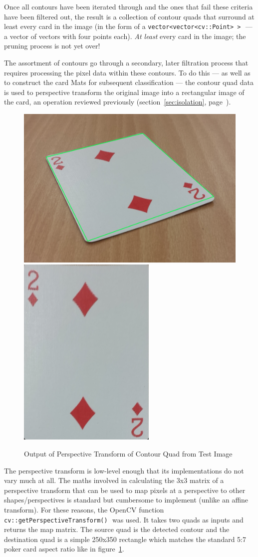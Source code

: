 \documentclass[a4paper,12pt,notitlepage]{article}
\newcommand{\secref}[1]{(section~\ref{#1}, page~\pageref{#1})}
\newcommand{\code}[1]{\colorbox{white}{\lstinline[basicstyle=\ttfamily\color{black}]|#1|} }
\begin{document}
			Once all contours have been iterated through and the ones that fail these criteria have been filtered out, the result is a collection of contour quads that surround at least every card in the image (in the form of a \code{vector<vector<cv::Point> >} --- a vector of vectors with four points each). \emph{At least} every card in the image; the pruning process is not yet over!

			The assortment of contours go through a secondary, later filtration process that requires processing the pixel data within these contours. To do this --- as well as to construct the card Mats for subsequent classification --- the contour quad data is used to perspective transform the original image into a rectangular image of the card, an operation reviewed previously \secref{sec:isolation}.

			\begin{figure}[H]
				\centering
				\includegraphics[width=0.6\linewidth]{perstrans1}
				\includegraphics[width=0.3\linewidth]{perstrans2}
				\caption{Output of Perspective Transform of Contour Quad from Test Image}
				\label{fig:perstrans}
			\end{figure}

			The perspective transform is low-level enough that its implementations do not vary much at all. The maths involved in calculating the 3x3 matrix of a perspective transform that can be used to map pixels at a perspective to other shapes/perspectives is standard but cumbersome to implement (unlike an affine transform). For these reasons, the OpenCV function \code{cv::getPerspectiveTransform()} was used. It takes two quads as inputs and returns the map matrix. The source quad is the detected contour and the destination quad is a simple 250x350 rectangle which matches the standard 5:7 poker card aspect ratio like in figure~\ref{fig:perstrans}.
\end{document}
